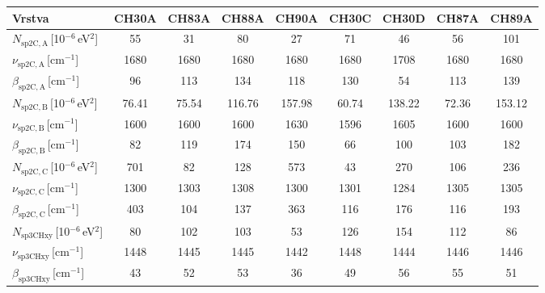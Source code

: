\begin{tabular}{lcccccccc}
\hline
Vrstva & CH30A & CH83A & CH88A & CH90A & CH30C & CH30D & CH87A & CH89A\\
\hline\hline
$N_\mathrm{sp2C,A}$\,[10$^{-6}$\,eV$^2$] & 55 & 31 & 80 & 27 & 71 & 46 & 56 & 101\\
$\nu_\mathrm{sp2C,A}$\,[cm$^{-1}$] & 1680 & 1680 & 1680 & 1680 & 1680 & 1708 & 1680 & 1680\\
$\beta_\mathrm{sp2C,A}$\,[cm$^{-1}$] & 96 & 113 & 134 & 118 & 130 & 54 & 113 & 139\\
$N_\mathrm{sp2C,B}$\,[10$^{-6}$\,eV$^2$] & 76.41 & 75.54 & 116.76 & 157.98 & 60.74 & 138.22 & 72.36 & 153.12\\
$\nu_\mathrm{sp2C,B}$\,[cm$^{-1}$] & 1600 & 1600 & 1600 & 1630 & 1596 & 1605 & 1600 & 1600\\
$\beta_\mathrm{sp2C,B}$\,[cm$^{-1}$] & 82 & 119 & 174 & 150 & 66 & 100 & 103 & 182\\
$N_\mathrm{sp2C,C}$\,[10$^{-6}$\,eV$^2$] & 701 & 82 & 128 & 573 & 43 & 270 & 106 & 236\\
$\nu_\mathrm{sp2C,C}$\,[cm$^{-1}$] & 1300 & 1303 & 1308 & 1300 & 1301 & 1284 & 1305 & 1305\\
$\beta_\mathrm{sp2C,C}$\,[cm$^{-1}$] & 403 & 104 & 137 & 363 & 116 & 176 & 116 & 193\\
$N_\mathrm{sp3CHxy}$\,[10$^{-6}$\,eV$^2$] & 80 & 102 & 103 & 53 & 126 & 154 & 112 & 86\\
$\nu_\mathrm{sp3CHxy}$\,[cm$^{-1}$] & 1448 & 1445 & 1445 & 1442 & 1448 & 1444 & 1446 & 1446\\
$\beta_\mathrm{sp3CHxy}$\,[cm$^{-1}$] & 43 & 52 & 53 & 36 & 49 & 56 & 55 & 51\\
\hline
\end{tabular}

